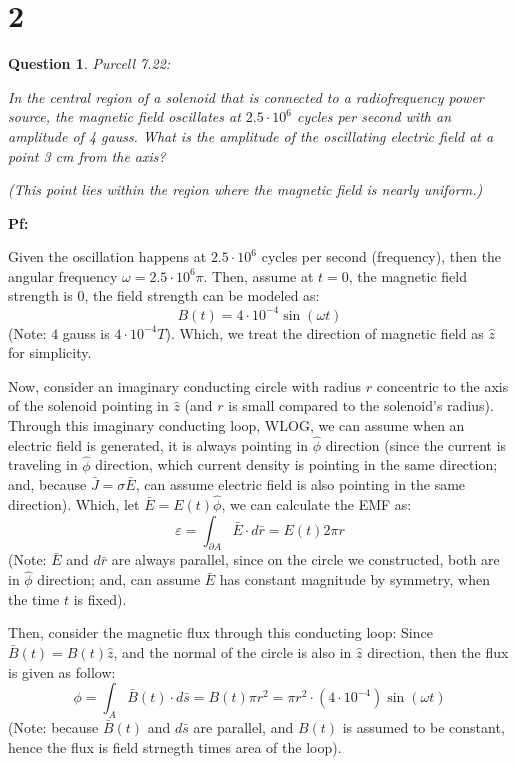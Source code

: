 \documentclass{article}
\newtheorem{question}{Question}
\begin{document}
\break

\section*{2}
\begin{myBox}[]{}
    \begin{question}
        Purcell 7.22:

        In the central region of a solenoid that is connected to a radiofrequency 
        power source, the magnetic field oscillates at $2.5\cdot 10^6$
        cycles per second with an amplitude of 4 gauss. What is the amplitude of 
        the oscillating electric field at a point 3 cm from the axis?

        (This point lies within the region where the magnetic field is nearly
        uniform.)
    \end{question}
\end{myBox}

\textbf{Pf:}

Given the oscillation happens at $2.5\cdot 10^6$ cycles per second (frequency), then the angular frequency $\omega = 2.5 \cdot 10^6\pi$.
Then, assume at $t=0$, the magnetic field strength is $0$, the field strength can be modeled as:
$$B(t)=4\cdot 10^{-4}\sin(\omega t)$$
(Note: $4$ gauss is $4\cdot 10^{-4} T$). Which, we treat the direction of magnetic field as $\hat{z}$ for simplicity.

\hfill

Now, consider an imaginary conducting circle with radius $r$ concentric to the axis of the solenoid pointing in $\hat{z}$ (and $r$ is small compared to the solenoid's radius).
Through this imaginary conducting loop, WLOG, we can assume when an electric field is generated, it is always pointing in $\hat{\phi}$ direction
(since the current is traveling in $\hat{\phi}$ direction, which current density is pointing in the same direction; and, because $\bar{J}=\sigma\bar{E}$, can assume electric field is also pointing in the same direction).
Which, let $\bar{E}=E(t)\hat{\phi}$, we can calculate the EMF as:
$$\varepsilon = \int_{\partial A}\bar{E}\cdot d\bar{r} = E(t) 2\pi r$$
(Note: $\bar{E}$ and $d\bar{r}$ are always parallel, since on the circle we constructed, both are in $\hat{\phi}$ direction; and, can assume $\bar{E}$ has constant magnitude by symmetry, when the time $t$ is fixed).

\hfill

Then, consider the magnetic flux through this conducting loop: Since $\bar{B}(t)=B(t)\hat{z}$, and the normal of the circle is also in $\hat{z}$ direction, then the flux is given as follow:
$$\phi = \int_A\bar{B}(t)\cdot d\bar{s}=B(t) \pi r^2 = \pi r^2 \cdot (4\cdot 10^{-4})\sin(\omega t)$$
(Note: because $\bar{B}(t)$ and $d\bar{s}$ are parallel, and $B(t)$ is assumed to be constant, hence the flux is field strnegth times area of the loop).
\end{document}
